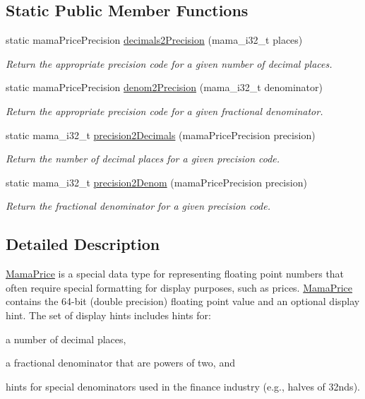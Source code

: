 \subsection*{Static Public Member Functions}
\begin{DoxyCompactItemize}
\item 
static mamaPricePrecision \hyperlink{classWombat_1_1MamaPrice_af667f9cbdc3d59231cd8d106ba76063f}{decimals2Precision} (mama\_\-i32\_\-t places)
\begin{DoxyCompactList}\small\item\em Return the appropriate precision code for a given number of decimal places. \item\end{DoxyCompactList}\item 
static mamaPricePrecision \hyperlink{classWombat_1_1MamaPrice_ae2b01c3e29fe9621e2d3ad61b598f4ff}{denom2Precision} (mama\_\-i32\_\-t denominator)
\begin{DoxyCompactList}\small\item\em Return the appropriate precision code for a given fractional denominator. \item\end{DoxyCompactList}\item 
static mama\_\-i32\_\-t \hyperlink{classWombat_1_1MamaPrice_aa0e9229468d1e14e03bdf1fc901eaf3d}{precision2Decimals} (mamaPricePrecision precision)
\begin{DoxyCompactList}\small\item\em Return the number of decimal places for a given precision code. \item\end{DoxyCompactList}\item 
static mama\_\-i32\_\-t \hyperlink{classWombat_1_1MamaPrice_a091e452e546dd5a8add9de6a1fbca364}{precision2Denom} (mamaPricePrecision precision)
\begin{DoxyCompactList}\small\item\em Return the fractional denominator for a given precision code. \item\end{DoxyCompactList}\end{DoxyCompactItemize}


\subsection{Detailed Description}
\hyperlink{classWombat_1_1MamaPrice}{MamaPrice} is a special data type for representing floating point numbers that often require special formatting for display purposes, such as prices. \hyperlink{classWombat_1_1MamaPrice}{MamaPrice} contains the 64-\/bit (double precision) floating point value and an optional display hint. The set of display hints includes hints for:
\begin{DoxyItemize}
\item a number of decimal places,
\item a fractional denominator that are powers of two, and
\item hints for special denominators used in the finance industry (e.g., halves of 32nds). 
\end{DoxyItemize}

